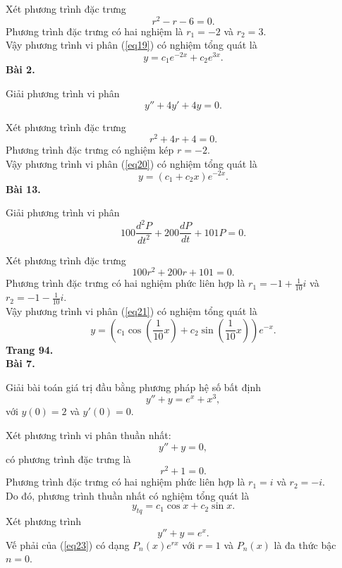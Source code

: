 \documentclass[12pt,a4paper]{article}
\begin{document}
Xét phương trình đặc trưng 
\[{r^2} - r - 6 = 0.\]
Phương trình đặc trưng có hai nghiệm là \({r_1} =  - 2\) và \({r_2} = 3.\)\\
Vậy phương trình vi phân (\ref{eq19}) có nghiệm tổng quát là
\[y = {c_1}{e^{ - 2x}} + {c_2}{e^{3x}}.\]
\textbf{Bài 2.}
\begin{mybox}
Giải phương trình vi phân
\begin{equation}
y'' + 4y' + 4y = 0.
\label{eq20}
\end{equation}
\end{mybox}
Xét phương trình đặc trưng 
\[r^2 + 4r + 4 = 0.\]
Phương trình đặc trưng có nghiệm kép \(r = -2.\)\\
Vậy phương trình vi phân (\ref{eq20}) có nghiệm tổng quát là
\[y = \left( {{c_1} + {c_2}x} \right){e^{ - 2x}}.\]
\textbf{Bài 13.}
\begin{mybox}
Giải phương trình vi phân
\begin{equation}
100\frac{{{d^2}P}}{{d{t^2}}} + 200\frac{{dP}}{{dt}} + 101P = 0.
\label{eq21}
\end{equation}
\end{mybox}
Xét phương trình đặc trưng 
\[100{r^2} + 200r + 101 = 0.\]
Phương trình đặc trưng có hai nghiệm phức liên hợp là \({r_1} =  - 1 + \frac{1}{{10}}i\) và \({r_2} =  - 1 - \frac{1}{{10}}i.\)\\
Vậy phương trình vi phân (\ref{eq21}) có nghiệm tổng quát là
\[y = \left( {{c_1}\cos \left( {\frac{1}{{10}}x} \right) + {c_2}\sin \left( {\frac{1}{{10}}x} \right)} \right){e^{ - x}}.\]
\textbf{Trang 94.}\\
\textbf{Bài 7.}
\begin{mybox}
Giải bài toán giá trị đầu bằng phương pháp hệ số bất định
\begin{equation}
y'' + y = {e^x} + {x^3},
\label{eq22}
\end{equation}
với \(y\left( 0 \right) = 2\) và \(y'\left( 0 \right) = 0.\)
\end{mybox}
Xét phương trình vi phân thuần nhất:
\[y'' + y = 0,\]
có phương trình đặc trưng là
\[{r^2} + 1 = 0.\]
Phương trình đặc trưng có hai nghiệm phức liên hợp là \({r_1} = i\) và \({r_2} =  - i.\) \\
Do đó, phương trình thuần nhất có nghiệm tổng quát là
\[{y_{tq}} = {c_1}\cos x + {c_2}\sin x.\]
Xét phương trình
\begin{equation}
y'' + y = {e^x}.
\label{eq23}
\end{equation}
Vế phải của (\ref{eq23}) có dạng \({P_n}\left( x \right){e^{rx}}\) với \(r = 1\) và \({P_n}\left( x \right)\) là đa thức bậc \(n = 0.\) \\
\end{document}
